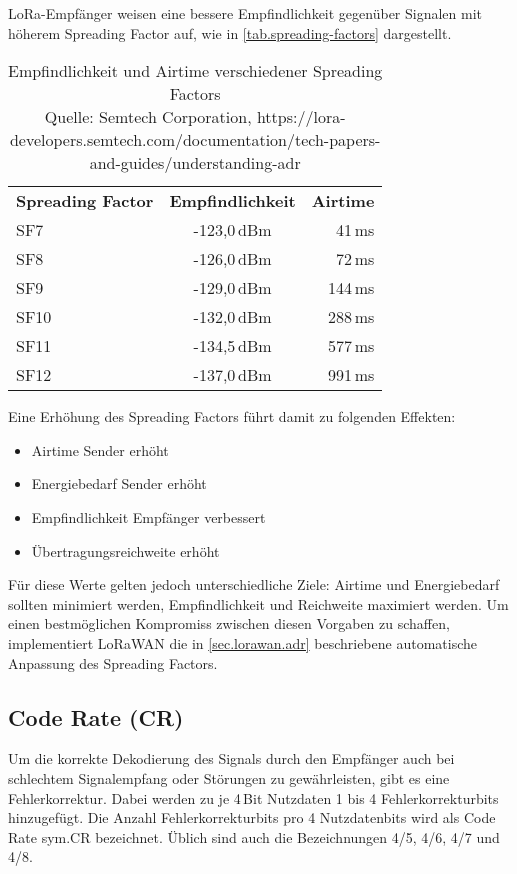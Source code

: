 LoRa-Empfänger weisen eine bessere Empfindlichkeit gegenüber Signalen mit höherem Spreading Factor auf, wie in \autoref{tab.spreading-factors} dargestellt.
\begin{table}[htbp]
\centering
\begin{tabular}{@{}lcr@{}}
\textbf{Spreading Factor} & \textbf{Empfindlichkeit} & \textbf{Airtime} \\
SF7  & -123,0\,dBm &  41\,ms \\
SF8  & -126,0\,dBm &  72\,ms \\
SF9  & -129,0\,dBm & 144\,ms \\
SF10 & -132,0\,dBm & 288\,ms \\
SF11 & -134,5\,dBm & 577\,ms \\
SF12 & -137,0\,dBm & 991\,ms \\
\end{tabular}
\caption[Empfindlichkeit und Airtime verschiedener Spreading Factors]{Empfindlichkeit und Airtime verschiedener Spreading Factors\\Quelle: Semtech Corporation, https://lora-developers.semtech.com/documentation/tech-papers-and-guides/understanding-adr}
\label{tab.spreading-factors}
\end{table}
Eine Erhöhung des Spreading Factors führt damit zu folgenden Effekten:
\begin{itemize}\singlespacing\setlength\itemsep{-0.2em}
\item Airtime Sender erhöht
\item Energiebedarf Sender erhöht
\item Empfindlichkeit Empfänger verbessert
\item Übertragungsreichweite erhöht
\end{itemize}
Für diese Werte gelten jedoch unterschiedliche Ziele: Airtime und Energiebedarf sollten minimiert werden, Empfindlichkeit und Reichweite maximiert werden.\cite{loralimits}
Um einen bestmöglichen Kompromiss zwischen diesen Vorgaben zu schaffen, implementiert LoRaWAN die in \autoref{sec.lorawan.adr} beschriebene automatische Anpassung des Spreading Factors.


\subsection{Code Rate (CR)}
Um die korrekte Dekodierung des Signals durch den Empfänger auch bei schlechtem Signalempfang oder Störungen zu gewährleisten, gibt es eine Fehlerkorrektur.
Dabei werden zu je 4\,Bit Nutzdaten 1 bis 4 Fehlerkorrekturbits hinzugefügt.
Die Anzahl Fehlerkorrekturbits pro 4 Nutzdatenbits wird als Code Rate \gls{sym.CR} bezeichnet.
Üblich sind auch die Bezeichnungen 4/5, 4/6, 4/7 und 4/8.

